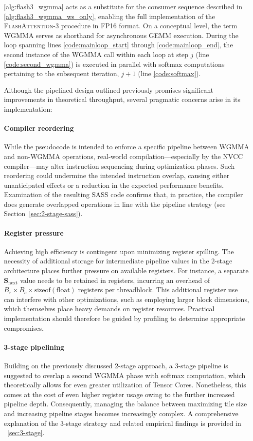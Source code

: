   \cref{alg:flash3_wgmma} acts as a substitute for the consumer sequence described in \cref{alg:flash3_wgmma_ws_only}, enabling the full implementation of the \textsc{FlashAttention-3} procedure in FP16 format. On a conceptual level, the term WGMMA serves as shorthand for asynchronous GEMM execution. During the loop spanning lines \ref{code:mainloop_start} through \ref{code:mainloop_end}, the second instance of the WGMMA call within each loop at step $j$ (line \ref{code:second_wgmma}) is executed in parallel with softmax computations pertaining to the subsequent iteration, $j+1$ (line \ref{code:softmax}).

Although the pipelined design outlined previously promises significant improvements in theoretical throughput, several pragmatic concerns arise in its implementation:
\paragraph{Compiler reordering} While the pseudocode is intended to enforce a specific pipeline between WGMMA and non-WGMMA operations, real-world compilation—especially by the NVCC compiler—may alter instruction sequencing during optimization phases. Such reordering could undermine the intended instruction overlap, causing either unanticipated effects or a reduction in the expected performance benefits. Examination of the resulting SASS code confirms that, in practice, the compiler does generate overlapped operations in line with the pipeline strategy (see Section~\ref{sec:2-stage-sass}).
\paragraph{Register pressure} Achieving high efficiency is contingent upon minimizing register spilling. The necessity of additional storage for intermediate pipeline values in the 2-stage architecture places further pressure on available registers. For instance, a separate $\mathbf{S}_{\mathrm{next}}$ value needs to be retained in registers, incurring an overhead of $B_r \times B_c \times \text{sizeof}(\text{float})$ registers per threadblock. This additional register use can interfere with other optimizations, such as employing larger block dimensions, which themselves place heavy demands on register resources. Practical implementation should therefore be guided by profiling to determine appropriate compromises.
\paragraph{3-stage pipelining} Building on the previously discussed 2-stage approach, a 3-stage pipeline is suggested to overlap a second WGMMA phase with softmax computation, which theoretically allows for even greater utilization of Tensor Cores. Nonetheless, this comes at the cost of even higher register usage owing to the further increased pipeline depth. Consequently, managing the balance between maximizing tile size and increasing pipeline stages becomes increasingly complex. A comprehensive explanation of the 3-stage strategy and related empirical findings is provided in ~\cref{sec:3-stage}.

